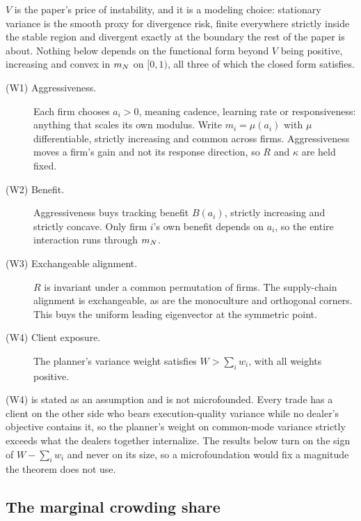 $V$ is the paper's price of instability, and it is a modeling choice: stationary variance is the smooth proxy for divergence risk, finite everywhere strictly inside the stable region and divergent exactly at the boundary the rest of the paper is about. Nothing below depends on the functional form beyond $V$ being positive, increasing and convex in $m_N$ on $[0,1)$, all three of which the closed form satisfies.

\begin{description}
\item[(W1) Aggressiveness.] Each firm chooses $a_i > 0$, meaning cadence, learning rate or responsiveness: anything that scales its own modulus. Write $m_i = \mu(a_i)$ with $\mu$ differentiable, strictly increasing and common across firms. Aggressiveness moves a firm's gain and not its response direction, so $R$ and $\kappa$ are held fixed.
\item[(W2) Benefit.] Aggressiveness buys tracking benefit $B(a_i)$, strictly increasing and strictly concave. Only firm $i$'s own benefit depends on $a_i$, so the entire interaction runs through $m_N$.
\item[(W3) Exchangeable alignment.] $R$ is invariant under a common permutation of firms. The supply-chain alignment is exchangeable, as are the monoculture and orthogonal corners. This buys the uniform leading eigenvector at the symmetric point.
\item[(W4) Client exposure.] The planner's variance weight satisfies $W > \sum_i w_i$, with all weights positive.
\end{description}

(W4) is stated as an assumption and is not microfounded. Every trade has a client on the other side who bears execution-quality variance while no dealer's objective contains it, so the planner's weight on common-mode variance strictly exceeds what the dealers together internalize. The results below turn on the sign of $W - \sum_i w_i$ and never on its size, so a microfoundation would fix a magnitude the theorem does not use.

\subsection{The marginal crowding share}

